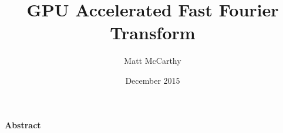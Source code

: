 \documentclass[notitlepage, twocolumn]{article}
\title{\bf
GPU Accelerated Fast Fourier Transform
}
\date{December 2015}
\author{
Matt McCarthy
}
\affil{Christopher Newport University\\
\texttt{\href{mailto:matthew.mccarthy.12@cnu.edu}{matthew.mccarthy.12@cnu.edu}}
}
\begin{document}
\maketitle

\noindent\textbf{Abstract}
\end{document}
